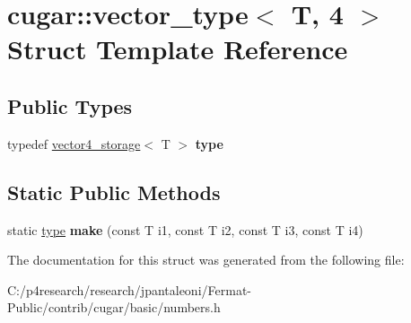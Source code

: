 \hypertarget{structcugar_1_1vector__type_3_01_t_00_014_01_4}{}\section{cugar\+:\+:vector\+\_\+type$<$ T, 4 $>$ Struct Template Reference}
\label{structcugar_1_1vector__type_3_01_t_00_014_01_4}
\subsection*{Public Types}
\begin{DoxyCompactItemize}
\item 
\mbox{\label{structcugar_1_1vector__type_3_01_t_00_014_01_4_aa52f3e81cf04155a888b808583c9a2c3}} 
typedef \hyperlink{structcugar_1_1vector4__storage}{vector4\+\_\+storage}$<$ T $>$ {\bfseries type}
\end{DoxyCompactItemize}
\subsection*{Static Public Methods}
\begin{DoxyCompactItemize}
\item 
\mbox{\label{structcugar_1_1vector__type_3_01_t_00_014_01_4_ad15c130db776293ea71920c6eb929247}} 
static \hyperlink{structcugar_1_1vector4__storage}{type} {\bfseries make} (const T i1, const T i2, const T i3, const T i4)
\end{DoxyCompactItemize}


The documentation for this struct was generated from the following file\+:\begin{DoxyCompactItemize}
\item 
C\+:/p4research/research/jpantaleoni/\+Fermat-\/\+Public/contrib/cugar/basic/numbers.\+h\end{DoxyCompactItemize}
